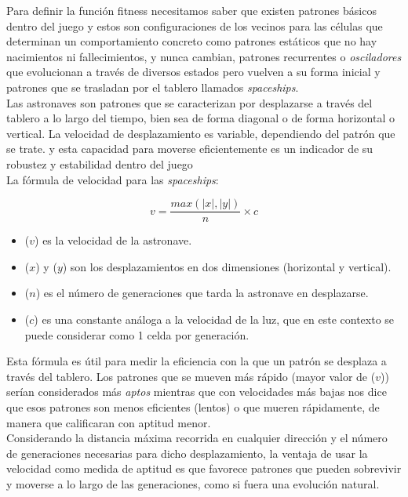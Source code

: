 Para definir la función fitness necesitamos saber que existen patrones básicos dentro del 
juego y estos son configuraciones de los vecinos para las células que determinan un 
comportamiento concreto como patrones estáticos que no hay nacimientos ni fallecimientos,
y nunca cambian, patrones recurrentes o \textit{osciladores} que evolucionan a través de 
diversos estados pero vuelven a su forma inicial y patrones que se trasladan por el tablero
llamados \textit{spaceships}.\\ 

Las astronaves \cite{spaceships} son patrones que se caracterizan 
por desplazarse a través del tablero a lo largo del tiempo, bien sea de forma diagonal 
o de forma horizontal o vertical. La velocidad de desplazamiento es variable, dependiendo 
del patrón que se trate. y esta capacidad para moverse eficientemente es un indicador 
de su robustez y estabilidad dentro del juego\\ 

\noindent La fórmula de velocidad para las \textit{spaceships}:

\begin{equation*}
    v = \frac{max(|x|,|y|)}{n} \times c
\end{equation*}

\begin{itemize}
    \item[] ($v$) es la velocidad de la astronave.
    \item[] ($x$) y ($y$) son los desplazamientos en dos dimensiones (horizontal y vertical).
    \item[] ($n$) es el número de generaciones que tarda la astronave en desplazarse.
    \item[] ($c$) es una constante análoga a la velocidad de la luz, que en este contexto se 
    puede considerar como 1 celda por generación.
\end{itemize}

Esta fórmula es útil para medir la eficiencia con la que un patrón se desplaza a través del 
tablero. Los patrones que se mueven más rápido (mayor valor de ($v$)) serían considerados 
más \textit{aptos} mientras que con velocidades más bajas nos dice que esos patrones son menos
eficientes (lentos) o que mueren rápidamente, de manera que calificaran con aptitud menor.\\    

Considerando la distancia máxima recorrida en cualquier dirección y el número de generaciones 
necesarias para dicho desplazamiento, la ventaja de usar la velocidad como medida de aptitud 
es que favorece patrones que pueden sobrevivir y moverse a lo largo de las generaciones, 
como si fuera una evolución natural.